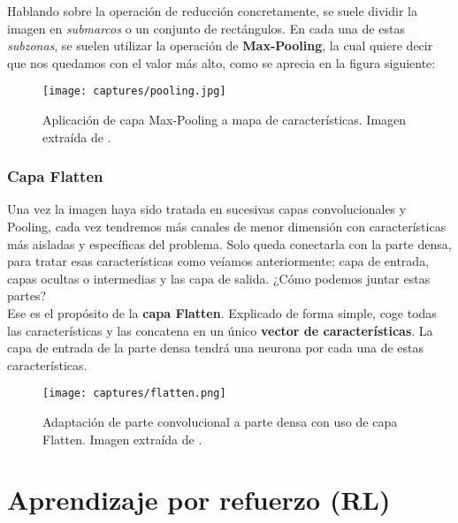 \documentclass[11pt,fleqn]{book} %
\begin{document}
Hablando sobre la operación de reducción concretamente, se suele dividir la imagen en \textit{submarcos} o un conjunto de rectángulos. En cada una de estas \textit{subzonas}, se suelen utilizar la operación de \textbf{Max-Pooling}, la cual quiere decir que nos quedamos con el valor más alto, como se aprecia en la figura siguiente:

\begin{figure}[H]
	\centering\texttt{[image: captures/pooling.jpg]}
	\caption{Aplicación de capa Max-Pooling a mapa de características. Imagen extraída de \cite{article:convimagen2}.}
	\label{fig:pooling} %
\end{figure}

\subsection{Capa Flatten}\label{sec:flatten}

Una vez la imagen haya sido tratada en sucesivas capas convolucionales y Pooling, cada vez tendremos más canales de menor dimensión con características más aisladas y específicas del problema. Solo queda conectarla con la parte densa, para tratar esas características como veíamos anteriormente; capa de entrada, capas ocultas o intermedias y las capa de salida. ¿Cómo podemos juntar estas partes? \\

Ese es el propósito de la \textbf{capa Flatten}. Explicado de forma simple, coge todas las características y las concatena en un único \textbf{vector de características}. La capa de entrada de la parte densa tendrá una neurona por cada una de estas características.

\begin{figure}[H]
	\centering\texttt{[image: captures/flatten.png]}
	\caption{Adaptación de parte convolucional a parte densa con uso de capa Flatten. Imagen extraída de \cite{article:convimagen3}.}
	\label{fig:flatten} %
\end{figure} 


\chapter{Aprendizaje por refuerzo (RL)}\label{sec:RL}
\end{document}

